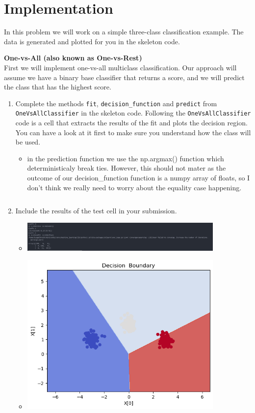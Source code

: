 \documentclass{article}
\newcommand{\nyuparagraph}[1]{\vspace{0.3cm}\textcolor{nyupurple}{\bf \large #1}\\}
\theoremstyle{plain}
\theoremstyle{definition}
\begin{document}
\section{Implementation}

In this problem we will work on a simple three-class classification
example.
The data is generated and plotted for you in the skeleton code. 

\nyuparagraph{One-vs-All (also known as One-vs-Rest)}

First we will implement one-vs-all multiclass classification.
Our approach will assume we have a binary base classifier that returns
a score, and we will predict the class that has the highest score. 
\begin{enumerate}
  \setcounter{enumi}{\value{saveenum}}
\item Complete the methods \texttt{fit}, \texttt{decision\_function} and \texttt{predict} from \texttt{OneVsAllClassifier}  in the skeleton code. Following
the \texttt{OneVsAllClassifier} code is a cell that extracts the results of
the fit and plots the decision region. You can have a look at it first to make sure you understand how the class will be used.
\begin{itemize}
    \color{blue}
    \item in the prediction function we use the np.argmax() function which deterministicaly break ties. However, this should not mater as the outcome of our decision\_function function is a numpy array of floats, so I don't think we really need to worry about the equality case happening. 
           \inputminted[firstline=23, lastline=84, breaklines=True]{python}{hw_5.py}
\end{itemize}

\item  Include the results of the test cell in your submission.
\begin{itemize}
    \color{blue}
    \item 

\includegraphics[width=10cm]{homework/homework_5/immages/q1_1.jpg}\item 
\includegraphics[width=10cm]{homework/homework_5/immages/q1_2.png}
\end{itemize}
\setcounter{saveenum}{\value{enumi}}
\end{enumerate}
\end{document}
